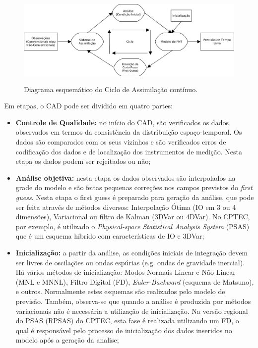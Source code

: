 \begin{figure}[!hbp]
\centering
\includegraphics[height=4.5cm]{./figs/ciclo_ad.png}
\caption{Diagrama esquemático do Ciclo de Assimilação contínuo.}
\label{fig02}
\end{figure}

Em etapas, o CAD pode ser dividido em quatro partes:

\begin{itemize}
\item \textbf{Controle de Qualidade:} no início do CAD, são verificados os dados observados em termos da consistência da distribuição espaço-temporal. Os dados são comparados com os seus vizinhos e são verificados erros de codificação dos dados e de localização dos instrumentos de medição. Nesta etapa os dados podem ser rejeitados ou não;
\item \textbf{Análise objetiva:} nesta etapa os dados observados são interpolados na grade do modelo e são feitas pequenas correções nos campos previstos do \textit{first guess}. Nesta etapa o {first guess} é preparado para geração da análise, que pode ser feita através de métodos diversos: Interpolação Ótima (IO em 3 ou 4 dimensões), Variacional ou filtro de Kalman (3DVar ou 4DVar). No CPTEC, por exemplo, é utilizado o \textit{Physical-space Statistical Analysis System} (PSAS) que é um esquema híbrido com características de IO e 3DVar;
\item \textbf{Inicialização:} a partir da análise, as condições iniciais de integração devem ser livres de oscilações ou ondas espúrias (e.g. ondas de gravidade inercial). Há vários métodos de inicialização: Modos Normais Linear e Não Linear (MNL e MNNL), Filtro Digital (FD), \textit{Euler-Backward} (esquema de Matsuno), e outros. Normalmente estes esquemas são realizados pelo modelo de previsão. Também, observa-se que quando a análise é produzida por métodos variacionais não é necessária a utilização de inicialização. Na versão regional do PSAS (RPSAS) do CPTEC, esta fase é realizada utilizando um FD, o qual é responsável pelo processo de inicialização dos dados inseridos no modelo após a geração da analise;

\end{itemize}
